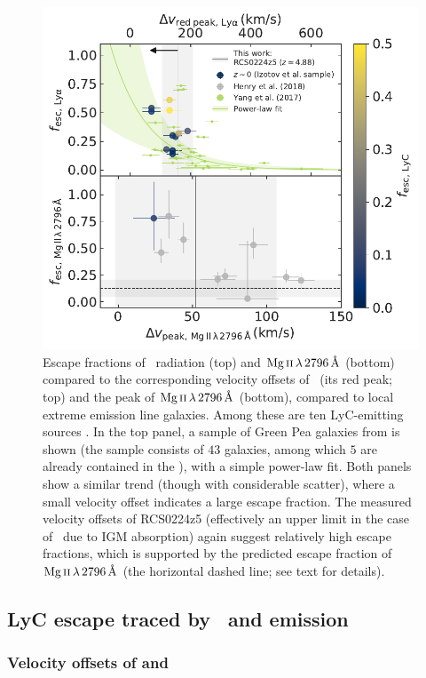 \begin{figure}
    \centering
    \includegraphics[width=0.6\linewidth]{"Plots/ChapterA/Lya-MgII_v_offsets_fesc"}
    \caption[Escape fractions compared to velocity offsets of \lya\ and $\MgII \, \lambda \, 2796 \, \Angstrom$]{Escape fractions of \lya\ radiation (top) and $\MgII \, \lambda \, 2796 \, \Angstrom$ (bottom) compared to the corresponding velocity offsets of \lya\ (its red peak; top) and the peak of $\MgII \, \lambda \, 2796 \, \Angstrom$ (bottom), compared to local extreme emission line galaxies. Among these are ten LyC-emitting sources \citep[the \Isample\ and][, coloured according to the escape fraction of LyC, if known]{2018ApJ...855...96H}. In the top panel, a sample of Green Pea galaxies from \citet{2016ApJ...820..130Y, 2017ApJ...844..171Y} is shown (the sample consists of $43$ galaxies, among which $5$ are already contained in the \Isample), with a simple power-law fit. Both panels show a similar trend (though with considerable scatter), where a small velocity offset indicates a large escape fraction. The measured velocity offsets of RCS0224z5 (effectively an upper limit in the case of \lya\ due to IGM absorption) again suggest relatively high escape fractions, which is supported by the predicted escape fraction of $\MgII \, \lambda \, 2796 \, \Angstrom$ (the horizontal dashed line; see text for details).
    }
    \label{chAfig:Lya/LyC-MgII escape and velocity offsets}
\end{figure}

\subsection{LyC escape traced by \texorpdfstring{\lya\ and \MgII}{\lyatext and Mg II} emission}
\label{chAssec:Discussion: Lya and MgII}

\subsubsection{Velocity offsets of \texorpdfstring{\lya}{\lyatext} and \texorpdfstring{\MgII}{Mg II}}
\label{chAsssec:Lya}

